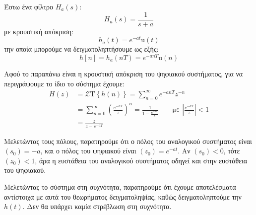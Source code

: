 \documentclass[11pt,a4paper,notitlepage,fleqn,draft]{article}
\begin{document}
Έστω ένα φίλτρο \( H_a(s) \):
\[
H_a(s) =\frac{1}{s+a}
\]
με κρουστική απόκριση:
\[
h_a(t) = e^{-at} \mathrm{u}(t)
\]
την οποία μπορούμε να δειγματοληπτήσουμε ως εξής:
\[
\boxed{h[n] = h_a(nT) = e^{-anT}\mathrm{u}(n)}
\]

Αφού το παραπάνω είναι η κρουστική απόκριση του ψηφιακού συστήματος, για να περιγράψουμε το ίδιο το
σύστημα έχουμε:
\begin{align*}
H(z) &= \mathcal{Z}\mathrm{T}\left\lbrace h(n) \right\rbrace = \sum_{n=0}^{\infty} e^{-anT} z^{-n}
\\&= \sum_{n=0}^{\infty} \left(\frac{e^{-aT}}{z}\right)^n
=\frac{1}{1-\frac{e^{-aT}}{z}} \qquad \text{με } \left|\frac{e^{-aT}}{z}\right|<1
\\ &= \frac{z}{z-e^{-aT}}
\end{align*}

Μελετώντας τους πόλους, παρατηρούμε ότι ο πόλος του αναλογικού συστήματος είναι \( (s_0) = -a \),
και ο πόλος του ψηφιακού είναι \( (z_0) = e^{-at} \). Αν \( (s_0) < 0 \), τότε \( (z_0) < 1 \), άρα
η ευστάθεια του αναλογικού συστήματος οδηγεί και στην ευστάθεια του ψηφιακού.

Μελετώντας το σύστημα στη συχνότητα, παρατηρούμε ότι έχουμε αποτελέσματα αντίστοιχα με αυτά του θεωρήματος δειγματοληψίας, καθώς δειγματοληπτούμε την \( h(t) \). Δεν θα υπάρχει καμία στρέβλωση στη
συχνότητα.
\end{document}
